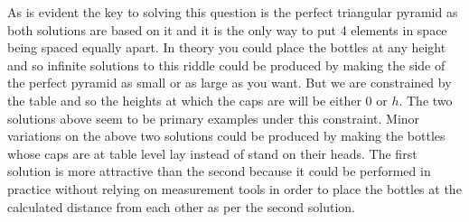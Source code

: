 As is evident the key to solving this question is the perfect triangular pyramid as both solutions are based on it and it is the only
way to put 4 elements in space being spaced equally apart. In theory you could place the bottles at any height and so
infinite solutions to this riddle could be produced by making the side of the perfect pyramid as small or as large as you want. But we are
constrained by the table and so the heights at which the caps are will be either $0$ or $h$. The two solutions above seem to be primary
examples under this constraint. Minor variations on the above two solutions could be produced by making the bottles whose caps are at table
level lay instead of stand on their heads. The first solution is more attractive than the second because it could be performed in practice
without relying on measurement tools in order to place the bottles at the calculated distance from each other as per the second solution.
